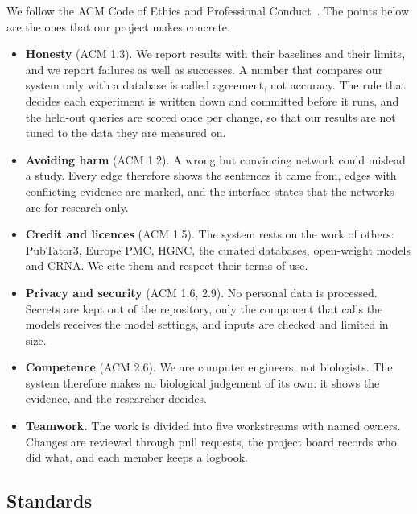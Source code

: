 \documentclass[11pt,a4paper]{article}
\begin{document}
We follow the ACM Code of Ethics and Professional Conduct~\cite{acmcode}. The points below are the
ones that our project makes concrete.
\begin{itemize}
  \item \textbf{Honesty} (ACM 1.3). We report results with their baselines and their limits, and
    we report failures as well as successes. A number that compares our system only with a
    database is called agreement, not accuracy. The rule that decides each experiment is
    written down and committed before it runs, and the held-out queries are scored once per
    change, so that our results are not tuned to the data they are measured on.
  \item \textbf{Avoiding harm} (ACM 1.2). A wrong but convincing network could mislead a study.
    Every edge therefore shows the sentences it came from, edges with conflicting evidence are
    marked, and the interface states that the networks are for research only.
  \item \textbf{Credit and licences} (ACM 1.5). The system rests on the work of others:
    PubTator3, Europe PMC, HGNC, the curated databases, open-weight models and CRNA. We cite them
    and respect their terms of use.
  \item \textbf{Privacy and security} (ACM 1.6, 2.9). No personal data is processed. Secrets are
    kept out of the repository, only the component that calls the models receives the model
    settings, and inputs are checked and limited in size.
  \item \textbf{Competence} (ACM 2.6). We are computer engineers, not biologists. The system
    therefore makes no biological judgement of its own: it shows the evidence, and the researcher
    decides.
  \item \textbf{Teamwork.} The work is divided into five workstreams with named owners. Changes are
    reviewed through pull requests, the project board records who did what, and each member keeps
    a logbook.
\end{itemize}

\subsection{Standards}
\end{document}
